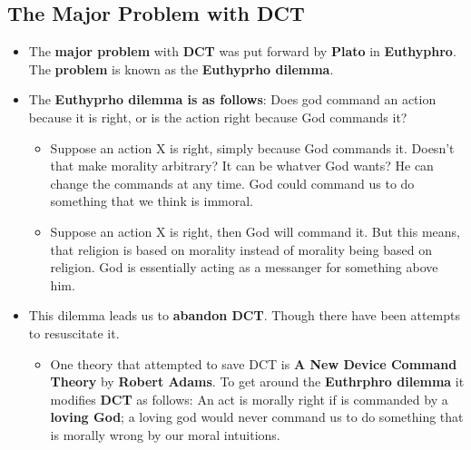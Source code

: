 \documentclass{article}
\begin{document}
    \subsection*{The Major Problem with DCT}
    \begin{itemize}
        \item The \textbf{major problem} with \textbf{DCT} was put forward by \textbf{Plato} in \textbf{Euthyphro}. The \textbf{problem} is known as the \textbf{Euthyprho dilemma}.
        \item The \textbf{Euthyprho dilemma is as follows}: Does god command an action because it is right, or is the action right because God commands it?
        \begin{itemize}
            \item Suppose an action X is right, simply because God commands it. Doesn't that make morality arbitrary? It can be whatver God wants? He can change the commands at any time. God could command us to do something that we think is immoral.
            \item Suppose an action X is right, then God will command it. But this means, that religion is based on morality instead of morality being based on religion. God is essentially acting as a messanger for something above him.
        \end{itemize}
        \item This dilemma leads us to \textbf{abandon DCT}. Though there have been attempts to resuscitate it.
        \begin{itemize}
            \item One theory that attempted to save DCT is \textbf{A New Device Command Theory} by \textbf{Robert Adams}. To get around the \textbf{Euthrphro dilemma} it modifies \textbf{DCT} as follows: An act is morally right if is commanded by a \textbf{loving God}; a loving god would never command us to do something that is morally wrong by our moral intuitions.
        \end{itemize}
    \end{itemize}    
\end{document}
